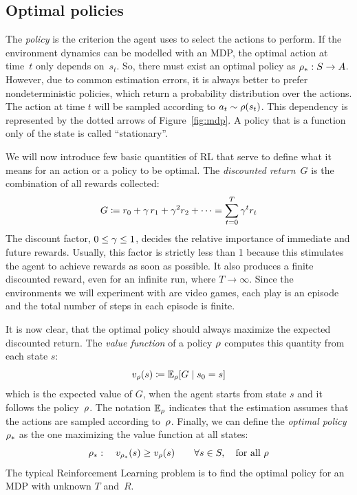 \subsection{Optimal policies}

The \emph{policy} is the criterion the agent uses to select the actions to
perform. If the environment dynamics can be modelled with an MDP, the
optimal action at time~$t$ only depends on~$s_{t}$. So, there must exist
an optimal policy as ${\rho}_*: S \to A$. However, due to common
estimation errors, it is always better to prefer nondeterministic policies,
which return a probability distribution over the actions. The action at time
$t$ will be sampled according to $a_t \sim \rho(s_t)$. This dependency is
represented by the dotted arrows of Figure~\ref{fig:mdp}. A policy that is a
function only of the state is called ``stationary''.

We will now introduce few basic quantities of RL that serve to define what it
means for an action or a policy to be optimal. The \emph{discounted
return}~$G$ is the combination of all rewards collected:
\begin{equation}
	G \coloneqq r_{0} + \gamma\, r_1 + \gamma^2 r_2 + \dots =
	\sum_{t=0}^{T} \gamma^{t} r_{t}
	\label{eq:return}
\end{equation}
The discount factor, $0 \le \gamma \le 1$, decides the relative importance
of immediate and future rewards. Usually, this factor is strictly less than 1
because this stimulates the agent to achieve rewards as soon as possible.
It also produces a finite discounted reward, even for an infinite run, where
$T \to \infty$.  Since the environments we will experiment with are video
games, each play is an episode and the total number of steps in each episode
is finite.

It is now clear, that the optimal policy should always maximize the expected
discounted return. The \emph{value function} of a policy $\rho$ computes
this quantity from each state $s$:
\begin{equation}
	v_{\rho}(s) \coloneqq \mathbb{E}_{\rho}[G \mid s_0 = s]
	\label{eq:mdp-value}
\end{equation}
which is the expected value of $G$, when the agent starts from state $s$
and it follows the policy~$\rho$. The notation $\mathbb{E}_{\rho}$ indicates
that the estimation assumes that the actions are sampled according
to~$\rho$. Finally, we can define the \emph{optimal policy}
${\rho}_*$ as the one maximizing the value function at all states:
\begin{equation}
	{\rho}_*: \quad v_{{\rho}_*}(s) \ge v_{\rho}(s) \qquad
	\forall s \in S, \quad \text{for all $\rho$}
\end{equation}
The typical Reinforcement Learning problem is to find the optimal policy for
an MDP with unknown $T$ and~$R$.

